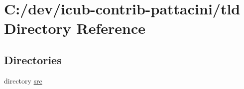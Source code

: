 \section{C\+:/dev/icub-\/contrib-\/pattacini/tld Directory Reference}
\label{dir_a2c9dc98e40be8ac43e96c9a55f75b68}
\subsection*{Directories}
\begin{DoxyCompactItemize}
\item 
directory \hyperlink{dir_20fa3fc76fbc47fba8d45ed812c1fa7f}{src}
\end{DoxyCompactItemize}
